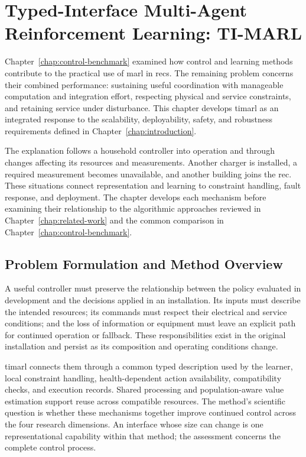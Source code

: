 \chapter{Typed-Interface Multi-Agent Reinforcement Learning: TI-MARL}
\label{chap:ti-marl}
\edef\timarlpostdisplaypenalty{\the\postdisplaypenalty}

Chapter~\ref{chap:control-benchmark} examined how control and learning methods contribute to the practical use of \gls{marl} in \glspl{rec}. The remaining problem concerns their combined performance: sustaining useful coordination with manageable computation and integration effort, respecting physical and service constraints, and retaining service under disturbance. This chapter develops \gls{timarl} as an integrated response to the scalability, deployability, safety, and robustness requirements defined in Chapter~\ref{chap:introduction}.

The explanation follows a household controller into operation and through changes affecting its resources and measurements. Another charger is installed, a required measurement becomes unavailable, and another building joins the \gls{rec}. These situations connect representation and learning to constraint handling, fault response, and deployment. The chapter develops each mechanism before examining their relationship to the algorithmic approaches reviewed in Chapter~\ref{chap:related-work} and the common comparison in Chapter~\ref{chap:control-benchmark}.

\section{Problem Formulation and Method Overview}
\label{sec:timarl-positioning}
\label{sec:timarl-closest-work}

A useful controller must preserve the relationship between the policy evaluated in development and the decisions applied in an installation. Its inputs must describe the intended resources; its commands must respect their electrical and service conditions; and the loss of information or equipment must leave an explicit path for continued operation or fallback. These responsibilities exist in the original installation and persist as its composition and operating conditions change.

\gls{timarl} connects them through a common typed description used by the learner, local constraint handling, health-dependent action availability, compatibility checks, and execution records. Shared processing and population-aware value estimation support reuse across compatible resources. The method's scientific question is whether these mechanisms together improve continued control across the four research dimensions. An interface whose size can change is one representational capability within that method; the assessment concerns the complete control process.


